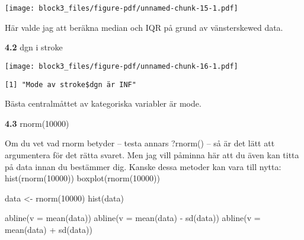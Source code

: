 \documentclass[
  letterpaper,
  DIV=11,
  numbers=noendperiod]{scrartcl}
\newenvironment{Shaded}{\begin{snugshade}}{\end{snugshade}}
\newcommand{\AttributeTok}[1]{\textcolor[rgb]{0.40,0.45,0.13}{#1}}
\newcommand{\ConstantTok}[1]{\textcolor[rgb]{0.56,0.35,0.01}{#1}}
\newcommand{\DecValTok}[1]{\textcolor[rgb]{0.68,0.00,0.00}{#1}}
\newcommand{\FunctionTok}[1]{\textcolor[rgb]{0.28,0.35,0.67}{#1}}
\newcommand{\NormalTok}[1]{\textcolor[rgb]{0.00,0.23,0.31}{#1}}
\newcommand{\OtherTok}[1]{\textcolor[rgb]{0.00,0.23,0.31}{#1}}
\newcommand{\SpecialCharTok}[1]{\textcolor[rgb]{0.37,0.37,0.37}{#1}}
\newcommand{\StringTok}[1]{\textcolor[rgb]{0.13,0.47,0.30}{#1}}
\begin{document}
\texttt{[image: block3\_files/figure-pdf/unnamed-chunk-15-1.pdf]}

Här valde jag att beräkna median och IQR på grund av vänsterskewed data.

\textbf{4.2} dgn i stroke

\begin{Shaded}
\end{Shaded}

\texttt{[image: block3\_files/figure-pdf/unnamed-chunk-16-1.pdf]}

\begin{Shaded}
\end{Shaded}

\begin{verbatim}
[1] "Mode av stroke$dgn är INF"
\end{verbatim}

Bästa centralmåttet av kategoriska variabler är mode.

\textbf{4.3} rnorm(10000)

Om du vet vad rnorm betyder -- testa annars ?rnorm() -- så är det lätt
att argumentera för det rätta svaret. Men jag vill påminna här att du
även kan titta på data innan du bestämmer dig. Kanske dessa metoder kan
vara till nytta: hist(rnorm(10000)) boxplot(rnorm(10000))

\begin{Shaded}
\begin{Highlighting}[]
\NormalTok{data }\OtherTok{\textless{}{-}} \FunctionTok{rnorm}\NormalTok{(}\DecValTok{10000}\NormalTok{)}
\FunctionTok{hist}\NormalTok{(data)}

\FunctionTok{abline}\NormalTok{(}\AttributeTok{v =} \FunctionTok{mean}\NormalTok{(data))}
\FunctionTok{abline}\NormalTok{(}\AttributeTok{v =} \FunctionTok{mean}\NormalTok{(data) }\SpecialCharTok{{-}} \FunctionTok{sd}\NormalTok{(data))}
\FunctionTok{abline}\NormalTok{(}\AttributeTok{v =} \FunctionTok{mean}\NormalTok{(data) }\SpecialCharTok{+} \FunctionTok{sd}\NormalTok{(data))}
\end{Highlighting}
\end{Shaded}
\end{document}
